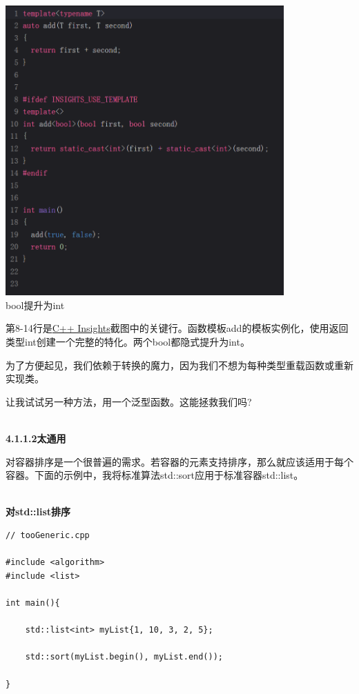 \begin{center}
\includegraphics[width=0.8\textwidth]{content/3/chapter4/images/1-1.png}\\
bool提升为int
\end{center}

第8-14行是\href{https://cppinsights.io/}{C++ Insights}截图中的关键行。函数模板add的模板实例化，使用返回类型int创建一个完整的特化。两个bool都隐式提升为int。

为了方便起见，我们依赖于转换的魔力，因为我们不想为每种类型重载函数或重新实现类。

让我试试另一种方法，用一个泛型函数。这能拯救我们吗?

\hspace*{\fill} \\ %
\noindent
\textbf{4.1.1.2\hspace{0.2cm}太通用}

对容器排序是一个很普遍的需求。若容器的元素支持排序，那么就应该适用于每个容器。下面的示例中，我将标准算法std::sort应用于标准容器std::list。

\hspace*{\fill} \\ %
\noindent
\textbf{对std::list排序}
\begin{lstlisting}[style=styleCXX]
// tooGeneric.cpp

#include <algorithm>
#include <list>

int main(){
	
	std::list<int> myList{1, 10, 3, 2, 5};
	
	std::sort(myList.begin(), myList.end());
	
}
\end{lstlisting}

